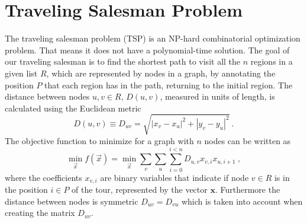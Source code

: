 \section{Traveling Salesman Problem}
The traveling salesman problem (TSP) is an NP-hard combinatorial optimization problem. That means it does not have a polynomial-time solution. The goal of our traveling salesman is to find the shortest path to visit all the $n$ regions in a given list $R$, which are represented by nodes in a graph, by annotating the position $P$ that each region has in the path, returning to the initial region. The distance between nodes $u,v \in R$, $D(u,v)$, measured in units of length, is calculated using the Euclidean metric
\begin{equation}
    D(u,v) \equiv D_{uv}= \sqrt{\left|x_{v} - x_{u}\right|^{2} + \left|y_{v} - y_{u} \right|^{2}}\ . 
\end{equation}
The objective function to minimize for a graph with $n$ nodes can be written as
\begin{equation}
\label{eq:TSP_noconstraints}
    \min_{\vec{x}} f(\vec{x}) = \min_{\vec{x}} \sum_{v} \sum_{u} \sum_{i=0}^{i<n}D_{u,v}x_{v,i}x_{u, i+1}\ ,
\end{equation}
where the coefficients $x_{v,i}$ are binary variables that indicate if node $v \in R$ is in the position $i\in P$ of the tour, represented by the vector $\mathbf{x}$. Furthermore the distance between nodes is symmetric $D_{uv} = D_{vu}$ which is taken into account when creating the matrix $D_{uv}$.
